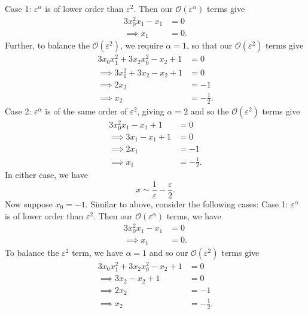 \documentclass{article}
\begin{document}
\begin{itemize}
\begin{itemize}
        Case 1: $\varepsilon^{\alpha}$ is of lower order than $\varepsilon^2$. Then our $\mathcal{O}(\varepsilon^{\alpha})$ terms give
        \begin{align*}
            3x_0^2x_1 - x_1 &= 0\\
            \implies x_1 &= 0.
        \end{align*}
        Further, to balance the $\mathcal{O}(\varepsilon^2)$, we require $\alpha = 1$, so that our $\mathcal{O}(\varepsilon^2)$ terms give
        \begin{align*}
            3x_0x_1^2 + 3x_2x_0^2 - x_2 + 1 &= 0\\
            \implies 3x_1^2 + 3x_2 - x_2 + 1 &= 0\\
            \implies 2x_2 &= -1\\
            \implies x_2 &= -\frac{1}{2}.
        \end{align*}
        Case 2: $\varepsilon^{\alpha}$ is of the same order of $\varepsilon^2$, giving $\alpha = 2$ and so the $\mathcal{O}(\varepsilon^2)$ terms give
        \begin{align*}
            3x_0^2x_1 - x_1 + 1 &= 0\\
            \implies 3x_1 - x_1 + 1 &= 0\\
            \implies 2x_1 &= -1\\
            \implies x_1 &= -\frac{1}{2}.
        \end{align*}
        In either case, we have
        \[x \sim \frac{1}{\varepsilon} - \frac{\varepsilon}{2}.\]
        Now suppose $x_0 = -1$. Similar to above, consider the following cases:
        \newline\newline
        Case 1: $\varepsilon^{\alpha}$ is of lower order than $\varepsilon^2$. Then our $\mathcal{O}(\varepsilon^{\alpha})$ terms, we have
        \begin{align*}
            3x_0^2x_1 - x_1 &= 0\\
            \implies x_1 &= 0.
        \end{align*}
        To balance the $\varepsilon^2$ term, we have $\alpha = 1$ and so our $\mathcal{O}(\varepsilon^2)$ terms give
        \begin{align*}
            3x_0x_1^2 + 3x_2x_0^2 - x_2 + 1 &= 0\\
            \implies 3x_2 - x_2 + 1 &= 0\\
            \implies 2x_2 &= -1\\
            \implies x_2 &= -\frac{1}{2}.

\end{align*}
\end{itemize}
\end{itemize}
\end{document}
